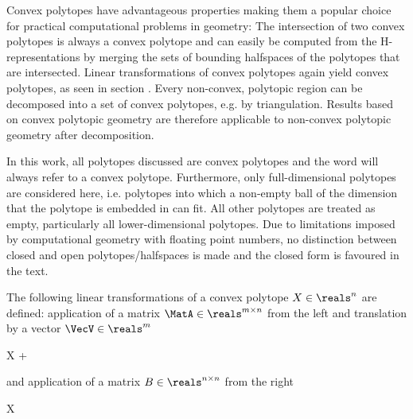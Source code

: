 \stopsubsection


\startsubsection[title={Properties of Convex Polytopes}]

    Convex polytopes have advantageous properties making them a popular choice for practical computational problems in geometry:
    The intersection of two convex polytopes is always a convex polytope and can easily be computed from the H-representations by merging the sets of bounding halfspaces of the polytopes that are intersected.
    Linear transformations of convex polytopes again yield convex polytopes, as seen in section .
    Every non-convex, polytopic region can be decomposed into a set of convex polytopes, e.g. by triangulation. %
    Results based on convex polytopic geometry are therefore applicable to non-convex polytopic geometry after decomposition.

    In this work, all polytopes discussed are convex polytopes and the word  will always refer to a convex polytope.
    Furthermore, only full-dimensional polytopes are considered here, i.e. polytopes into which a non-empty ball of the dimension that the polytope is embedded in can fit.
    All other polytopes are treated as empty, particularly all lower-dimensional polytopes.
    Due to limitations imposed by computational geometry with floating point numbers, no distinction between closed and open polytopes/halfspaces is made and the closed form is favoured in the text.

\stopsubsection


\startsubsection[title={Operations on Convex Polytopes},reference=sec:theory-geometry-operations]

    The following linear transformations of a convex polytope $X \in \reals^n$ are defined:
    application of a matrix $\MatA \in \reals^{m \times n}$ from the left and translation by a vector $\VecV \in \reals^m$

    \startformula
        \MatA X + \VecV \colonequals {}
    \stopformula

    and application of a matrix $B \in \reals^{n \times n}$ from the right

    \startformula
        X \MatB \colonequals {} \EndPeriod
    \stopformula

